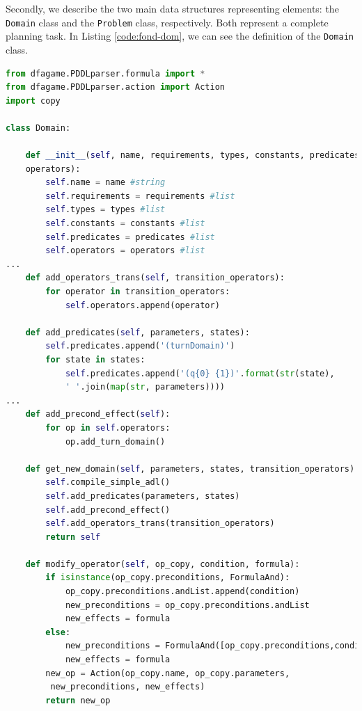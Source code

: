 Secondly, we describe the two main data structures representing \PDDL elements: the \texttt{Domain} class and the \texttt{Problem} class, respectively. Both represent a complete planning task. In Listing \ref{code:fond-dom}, we can see the definition of the \texttt{Domain} class.

\begin{lstlisting}[language=Python, style=Python, escapechar = £,  label={code:fond-dom}, caption={The \texttt{Domain} class.}]
from dfagame.PDDLparser.formula import *
from dfagame.PDDLparser.action import Action
import copy

class Domain:

    def __init__(self, name, requirements, types, constants, predicates, 
    operators):
        self.name = name #string
        self.requirements = requirements #list
        self.types = types #list
        self.constants = constants #list
        self.predicates = predicates #list
        self.operators = operators #list
...
    def add_operators_trans(self, transition_operators):
        for operator in transition_operators:
            self.operators.append(operator)

    def add_predicates(self, parameters, states):
        self.predicates.append('(turnDomain)')
        for state in states:
            self.predicates.append('(q{0} {1})'.format(str(state), 
            ' '.join(map(str, parameters))))
...
    def add_precond_effect(self):
        for op in self.operators:
            op.add_turn_domain()

    def get_new_domain(self, parameters, states, transition_operators):£\label{line:new-dom}£
        self.compile_simple_adl()
        self.add_predicates(parameters, states)
        self.add_precond_effect()
        self.add_operators_trans(transition_operators)
        return self

    def modify_operator(self, op_copy, condition, formula):
        if isinstance(op_copy.preconditions, FormulaAnd):
            op_copy.preconditions.andList.append(condition)
            new_preconditions = op_copy.preconditions.andList
            new_effects = formula
        else:
            new_preconditions = FormulaAnd([op_copy.preconditions,condition])
            new_effects = formula
        new_op = Action(op_copy.name, op_copy.parameters,
         new_preconditions, new_effects)
        return new_op


\end{lstlisting}
